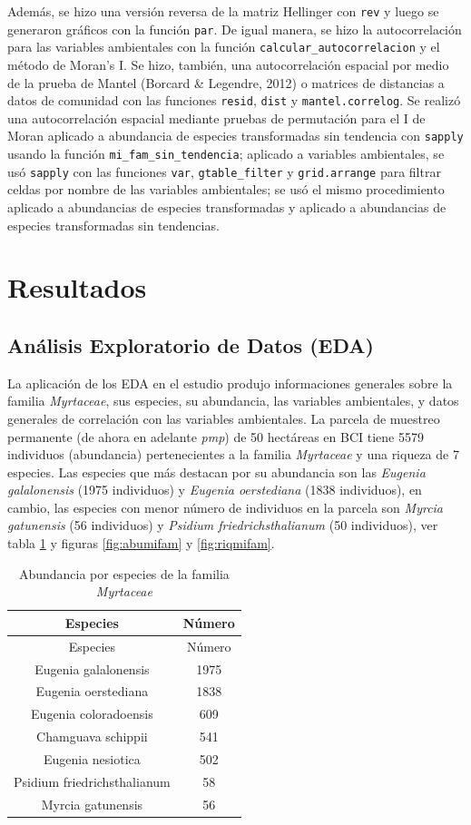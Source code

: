 \documentclass[11pt,]{article}
\begin{document}
Además, se hizo una versión reversa de la matriz Hellinger con
\texttt{rev} y luego se generaron gráficos con la función \texttt{par}.
De igual manera, se hizo la autocorrelación para las variables
ambientales con la función \texttt{calcular\_autocorrelacion} y el
método de Moran's I. Se hizo, también, una autocorrelación espacial por
medio de la prueba de Mantel (Borcard \& Legendre, 2012) o matrices de
distancias a datos de comunidad con las funciones \texttt{resid},
\texttt{dist} y \texttt{mantel.correlog}. Se realizó una autocorrelación
espacial mediante pruebas de permutación para el I de Moran aplicado a
abundancia de especies transformadas sin tendencia con \texttt{sapply}
usando la función \texttt{mi\_fam\_sin\_tendencia}; aplicado a variables
ambientales, se usó \texttt{sapply} con las funciones \texttt{var},
\texttt{gtable\_filter} y \texttt{grid.arrange} para filtrar celdas por
nombre de las variables ambientales; se usó el mismo procedimiento
aplicado a abundancias de especies transformadas y aplicado a
abundancias de especies transformadas sin tendencias.

\section{Resultados}\label{resultados}

\subsection{Análisis Exploratorio de Datos
(EDA)}\label{anuxe1lisis-exploratorio-de-datos-eda}

La aplicación de los EDA en el estudio produjo informaciones generales
sobre la familia \emph{Myrtaceae}, sus especies, su abundancia, las
variables ambientales, y datos generales de correlación con las
variables ambientales. La parcela de muestreo permanente (de ahora en
adelante \emph{pmp}) de 50 hectáreas en BCI tiene 5579 individuos
(abundancia) pertenecientes a la familia \emph{Myrtaceae} y una riqueza
de 7 especies. Las especies que más destacan por su abundancia son las
\emph{Eugenia galalonensis} (1975 individuos) y \emph{Eugenia
oerstediana} (1838 individuos), en cambio, las especies con menor número
de individuos en la parcela son \emph{Myrcia gatunensis} (56 individuos)
y \emph{Psidium friedrichsthalianum} (50 individuos), ver tabla
\ref{tab:specabu} y figuras \ref{fig:abumifam} y \ref{fig:riqmifam}.

\begin{longtable}[]{@{}cc@{}}
\caption{\label{tab:specabu} Abundancia por especies de la familia
\emph{Myrtaceae}}\tabularnewline
\toprule
Especies & Número\tabularnewline
\midrule
\endfirsthead
\toprule
Especies & Número\tabularnewline
\midrule
\endhead
Eugenia galalonensis & 1975\tabularnewline
Eugenia oerstediana & 1838\tabularnewline
Eugenia coloradoensis & 609\tabularnewline
Chamguava schippii & 541\tabularnewline
Eugenia nesiotica & 502\tabularnewline
Psidium friedrichsthalianum & 58\tabularnewline
Myrcia gatunensis & 56\tabularnewline
\bottomrule
\end{longtable}
\end{document}
